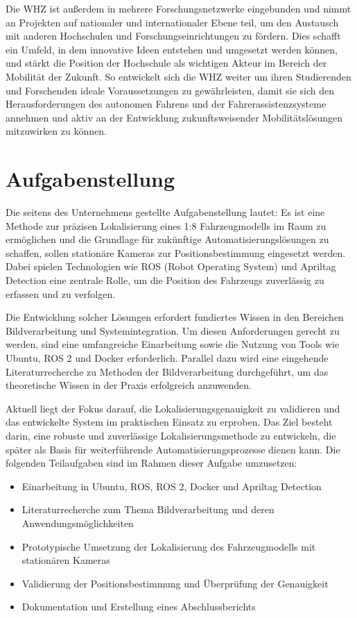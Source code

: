 \documentclass[ngerman]{article}    %
\theoremstyle{definition}
\begin{document}
Die WHZ ist außerdem in mehrere Forschungsnetzwerke eingebunden und nimmt an Projekten auf nationaler und internationaler Ebene teil, um den Austausch mit anderen Hochschulen und Forschungseinrichtungen zu fördern. Dies schafft ein Umfeld, in dem innovative Ideen entstehen und umgesetzt werden können, und stärkt die Position der Hochschule als wichtigen Akteur im Bereich der Mobilität der Zukunft. So entwickelt sich die WHZ weiter um ihren Studierenden und Forschenden ideale Voraussetzungen zu gewährleisten, damit sie sich den Herausforderungen des autonomen Fahrens und der Fahrerassistenzsysteme annehmen und aktiv an der Entwicklung zukunftsweisender Mobilitätslösungen mitzuwirken zu können. 


\section{Aufgabenstellung}

Die seitens des Unternehmens gestellte Aufgabenstellung lautet: Es ist eine Methode zur präzisen Lokalisierung eines 1:8 Fahrzeugmodells im Raum zu ermöglichen und die Grundlage für zukünftige Automatisierungslösungen zu schaffen, sollen stationäre Kameras zur Positionsbestimmung eingesetzt werden. Dabei spielen Technologien wie ROS (Robot Operating System) und Apriltag Detection eine zentrale Rolle, um die Position des Fahrzeugs zuverlässig zu erfassen und zu verfolgen.

Die Entwicklung solcher Lösungen erfordert fundiertes Wissen in den Bereichen Bildverarbeitung und Systemintegration. Um diesen Anforderungen gerecht zu werden, sind eine umfangreiche Einarbeitung sowie die Nutzung von Tools wie Ubuntu, ROS 2 und Docker erforderlich. Parallel dazu wird eine eingehende Literaturrecherche zu Methoden der Bildverarbeitung durchgeführt, um das theoretische Wissen in der Praxis erfolgreich anzuwenden.

Aktuell liegt der Fokus darauf, die Lokalisierungsgenauigkeit zu validieren und das entwickelte System im praktischen Einsatz zu erproben. Das Ziel besteht darin, eine robuste und zuverlässige Lokalisierungsmethode zu entwickeln, die später als Basis für weiterführende Automatisierungsprozesse dienen kann. Die folgenden Teilaufgaben sind im Rahmen dieser Aufgabe umzusetzen:

\begin{itemize}
    \item Einarbeitung in Ubuntu, ROS, ROS 2, Docker und Apriltag Detection
    \item Literaturrecherche zum Thema Bildverarbeitung und deren Anwendungsmöglichkeiten
    \item Prototypische Umsetzung der Lokalisierung des Fahrzeugmodells mit stationären Kameras
    \item Validierung der Positionsbestimmung und Überprüfung der Genauigkeit
    \item Dokumentation und Erstellung eines Abschlussberichts
\end{itemize}
\end{document}
